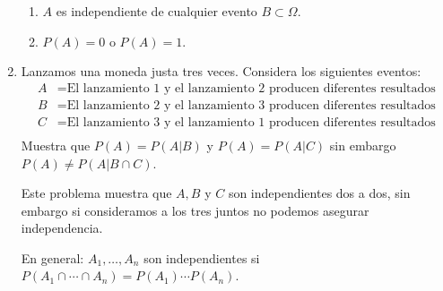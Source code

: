 \documentclass{report}
\begin{document}
\begin{enumerate}
\begin{enumerate}
        \item $A$ es independiente de cualquier evento $B\subset \Omega$.
        \item $P(A)=0$ o $P(A)=1$. 
    \end{enumerate}
    \item Lanzamos una moneda justa tres veces. Considera los siguientes eventos:
    \begin{align*}
        A & = \text{El lanzamiento 1 y el lanzamiento 2 producen diferentes resultados}\\
        B & = \text{El lanzamiento 2 y el lanzamiento 3 producen diferentes resultados}\\
        C & = \text{El lanzamiento 3 y el lanzamiento 1 producen diferentes resultados}\\
    \end{align*}
    Muestra que $P(A)=P(A\vert B)$ y $P(A)=P(A\vert C)$ sin embargo $P(A)\neq P(A\vert B\cap C)$.

    Este problema muestra que $A, B$ y $C$ son independientes dos a dos, sin embargo si consideramos a los tres juntos no podemos asegurar independencia.

    En general:  $A_1,\ldots, A_n$ son independientes si $P(A_1\cap\cdots\cap A_n)=P(A_1)\cdots P(A_n)$.
\end{enumerate} 
\end{document}
